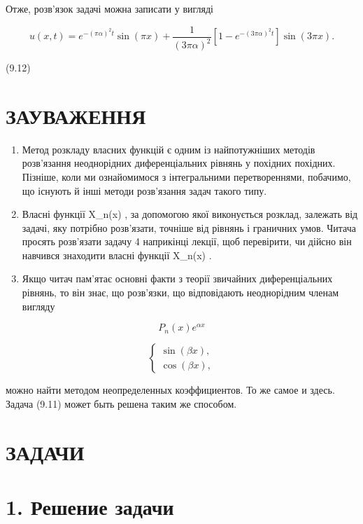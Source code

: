 \documentclass[
  ukrainian,
]{article}
\begin{document}
Отже, розв'язок задачі можна записати у вигляді

\[
u(x, t) = e^{-(\pi\alpha)^2 t} \sin(\pi x) + \frac{1}{(3\pi\alpha)^2} [1 - e^{-(3\pi\alpha)^2 t}] \sin(3\pi x).
\]

(9.12)

\section{ЗАУВАЖЕННЯ}\label{ux437ux430ux443ux432ux430ux436ux435ux43dux43dux44f-4}

\begin{enumerate}
\def\labelenumi{\arabic{enumi}.}
\item
  Метод розкладу власних функцій є одним із найпотужніших методів
  розв'язання неоднорідних диференціальних рівнянь у похідних похідних.
  Пізніше, коли ми ознайомимося з інтегральними перетвореннями,
  побачимо, що існують й інші методи розв'язання задач такого типу.
\item
  Власні функції X\_n(x) , за допомогою якої виконується розклад,
  залежать від задачі, яку потрібно розв'язати, точніше від рівнянь і
  граничних умов. Читача просять розв'язати задачу 4 наприкінці лекції,
  щоб перевірити, чи дійсно він навчився знаходити власні функції
  X\_n(x) .
\item
  Якщо читач пам'ятає основні факти з теорії звичайних диференціальних
  рівнянь, то він знає, що розв'язки, що відповідають неоднорідним
  членам вигляду
\end{enumerate}

\[
P_n(x) e^{\alpha x}
\]

\[
\begin{cases} \sin{(\beta x)}, \\ \cos{(\beta x)}, \end{cases}
\]

можно найти методом неопределенных коэффициентов. То же самое и здесь.
Задача (9.11) может быть решена таким же способом.

\section{ЗАДАЧИ}\label{ux437ux430ux434ux430ux447ux438}

\section{1. Решение
задачи}\label{ux440ux435ux448ux435ux43dux438ux435-ux437ux430ux434ux430ux447ux438}
\end{document}
